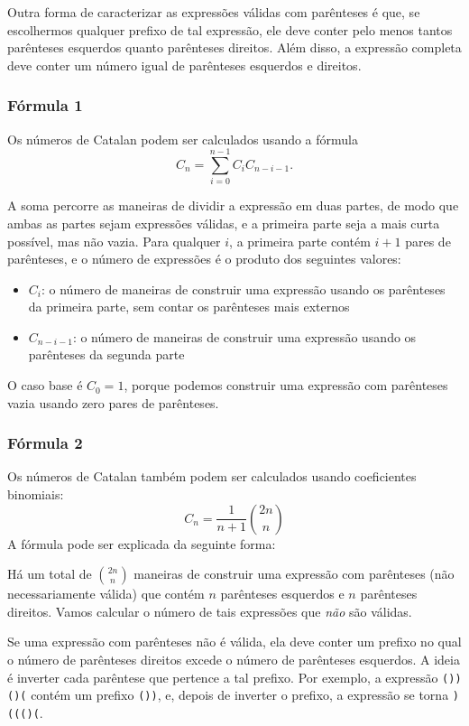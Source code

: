 Outra forma de caracterizar as expressões válidas
com parênteses é que, se
escolhermos qualquer prefixo de tal expressão,
ele deve conter pelo menos tantos parênteses esquerdos
quanto parênteses direitos.
Além disso, a expressão completa deve
conter um número igual de parênteses esquerdos e direitos.

\subsubsection{Fórmula 1}

Os números de Catalan podem ser calculados usando a fórmula
\[ C_n = \sum_{i=0}^{n-1} C_{i} C_{n-i-1}.\]

A soma percorre as maneiras de dividir a
expressão em duas partes,
de modo que ambas as partes sejam expressões válidas,
e a primeira parte seja a mais curta possível,
mas não vazia.
Para qualquer $i$, a primeira parte contém $i+1$ pares
de parênteses, e o número de expressões
é o produto dos seguintes valores:

\begin{itemize}
\item $C_{i}$: o número de maneiras de construir uma expressão
usando os parênteses da primeira parte,
sem contar os parênteses mais externos
\item $C_{n-i-1}$: o número de maneiras de construir uma
expressão usando os parênteses da segunda parte
\end{itemize}

O caso base é $C_0=1$,
porque podemos construir uma expressão com parênteses vazia
usando zero pares de parênteses.

\subsubsection{Fórmula 2}

Os números de Catalan também podem ser calculados
usando coeficientes binomiais:
\[ C_n = \frac{1}{n+1} {2n \choose n}\]
A fórmula pode ser explicada da seguinte forma:

Há um total de ${2n \choose n}$ maneiras
de construir uma expressão com parênteses (não necessariamente válida)
que contém $n$ parênteses esquerdos
e $n$ parênteses direitos.
Vamos calcular o número de tais
expressões que \emph{não} são válidas.

Se uma expressão com parênteses não é válida,
ela deve conter um prefixo no qual o
número de parênteses direitos excede o
número de parênteses esquerdos.
A ideia é inverter cada parêntese
que pertence a tal prefixo.
Por exemplo, a expressão
\texttt{())()(} contém um prefixo \texttt{())},
e, depois de inverter o prefixo,
a expressão se torna \texttt{)((()(}.

